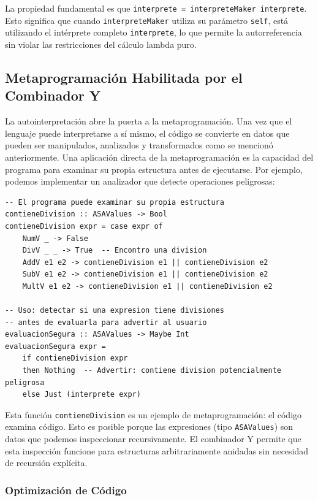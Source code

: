 \documentclass[11pt]{article}
\begin{document}
La propiedad fundamental es que \texttt{interprete = interpreteMaker interprete}. Esto significa que cuando \texttt{interpreteMaker} utiliza su parámetro \texttt{self}, está utilizando el intérprete completo \texttt{interprete}, lo que permite la autorreferencia sin violar las restricciones del cálculo lambda puro.

\subsection{Metaprogramación Habilitada por el Combinador Y}

La autointerpretación abre la puerta a la metaprogramación. Una vez que el lenguaje puede interpretarse a sí mismo, el código se convierte en datos que pueden ser manipulados, analizados y transformados como se mencion\'o anteriormente.
Una aplicación directa de la metaprogramación es la capacidad del programa para examinar su propia estructura antes de ejecutarse. Por ejemplo, podemos implementar un analizador que detecte operaciones peligrosas:

\begin{lstlisting}[caption={Análisis estático de código}]
-- El programa puede examinar su propia estructura
contieneDivision :: ASAValues -> Bool
contieneDivision expr = case expr of
    NumV _ -> False
    DivV _ _ -> True  -- Encontro una division
    AddV e1 e2 -> contieneDivision e1 || contieneDivision e2
    SubV e1 e2 -> contieneDivision e1 || contieneDivision e2
    MultV e1 e2 -> contieneDivision e1 || contieneDivision e2

-- Uso: detectar si una expresion tiene divisiones
-- antes de evaluarla para advertir al usuario
evaluacionSegura :: ASAValues -> Maybe Int
evaluacionSegura expr =
    if contieneDivision expr
    then Nothing  -- Advertir: contiene division potencialmente peligrosa
    else Just (interprete expr)
\end{lstlisting}

Esta función \texttt{contieneDivision} es un ejemplo de metaprogramación: el código examina código. Esto es posible porque las expresiones (tipo \texttt{ASAValues}) son datos que podemos inspeccionar recursivamente. El combinador Y permite que esta inspección funcione para estructuras arbitrariamente anidadas sin necesidad de recursión explícita.

\subsubsection{Optimización de Código}
\end{document}

